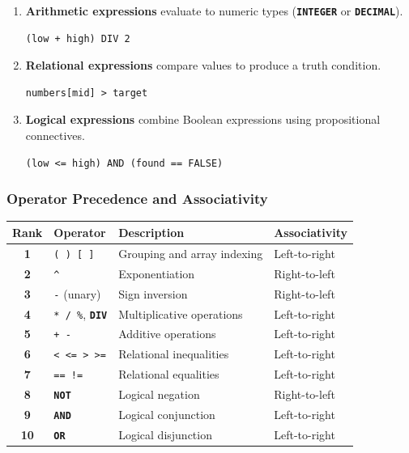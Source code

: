 \documentclass[11pt,a4paper]{article}
\newcommand{\kw}[1]{\texttt{\bfseries\color{pupmaroon}#1}}
\newcommand{\codeinline}[1]{\texttt{#1}}
\begin{document}
\begin{enumerate}
  \item \textbf{Arithmetic expressions} evaluate to numeric types (\kw{INTEGER} or \kw{DECIMAL}).
\begin{lstlisting}
(low + high) DIV 2
\end{lstlisting}
  \item \textbf{Relational expressions} compare values to produce a truth condition.
\begin{lstlisting}
numbers[mid] > target
\end{lstlisting}
  \item \textbf{Logical expressions} combine Boolean expressions using propositional connectives.
\begin{lstlisting}
(low <= high) AND (found == FALSE)
\end{lstlisting}
\end{enumerate}

\subsubsection{Operator Precedence and Associativity}

\begin{table}[H]
\centering
\begin{tabularx}{\linewidth}{>{\bfseries}c L{34mm} Y L{28mm}}
\toprule
Rank & Operator & Description & Associativity \\
 & \codeinline{( ) [ ]} & Grouping and array indexing & Left-to-right \\
2 & \codeinline{\textasciicircum} & Exponentiation & Right-to-left \\
3 & \codeinline{-} (unary) & Sign inversion & Right-to-left \\
4 & \codeinline{* / \%}, \kw{DIV} & Multiplicative operations & Left-to-right \\
5 & \codeinline{+ -} & Additive operations & Left-to-right \\
6 & \codeinline{< <= > >=} & Relational inequalities & Left-to-right \\
7 & \codeinline{== !=} & Relational equalities & Left-to-right \\
8 & \kw{NOT} & Logical negation & Right-to-left \\
9 & \kw{AND} & Logical conjunction & Left-to-right \\
10 & \kw{OR} & Logical disjunction & Left-to-right \\
\bottomrule
\end{tabularx}
\end{table}
\end{document}

